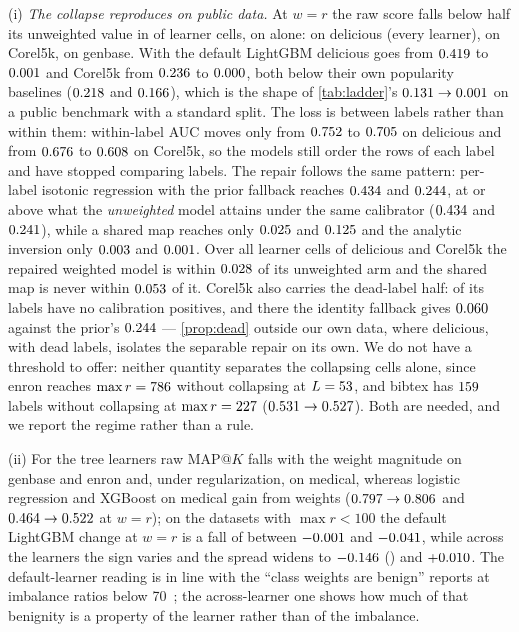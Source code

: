 \documentclass[sigconf,nonacm]{acmart}
\makeatletter
\newcommand{\mapk}{\mathrm{MAP}@K\xspace}
\makeatother
\begin{document}
(i) \emph{The collapse reproduces on public data.} At $w{=}r$ the raw score falls below half its unweighted value in \nnCollapseCells{} of \nnDoseCells{} learner cells, on \ncollapseDatasets{} alone: \nnDelCollapseLearners{} on delicious (every learner), \nnCorelCollapseLearners{} on Corel5k, \nnOtherCollapseCells{} on genbase. With the default LightGBM delicious goes from $0.419$ to $0.001$ and Corel5k from $0.236$ to $0.000$, both below their own popularity baselines ($0.218$ and $0.166$), which is the shape of \cref{tab:ladder}'s $0.131\to0.001$ on a public benchmark with a standard split. The loss is between labels rather than within them: within-label AUC moves only from $0.752$ to $0.705$ on delicious and from $0.676$ to $0.608$ on Corel5k, so the models still order the rows of each label and have stopped comparing labels. The repair follows the same pattern: per-label isotonic regression with the prior fallback reaches $0.434$ and $0.244$, at or above what the \emph{unweighted} model attains under the same calibrator ($0.434$ and $0.241$), while a shared map reaches only $0.025$ and $0.125$ and the analytic inversion only $0.003$ and $0.001$. Over all \nnRepairCollapseCells{} learner cells of delicious and Corel5k the repaired weighted model is within $0.028$ of its unweighted arm and the shared map is never within $0.053$ of it. Corel5k also carries the dead-label half: \ncorelDeadCalDose{} of its \ncorelL{} labels have no calibration positives, and there the identity fallback gives $0.060$ against the prior's $0.244$ --- \cref{prop:dead} outside our own data, where delicious, with \ndelDeadCalDose{} dead labels, isolates the separable repair on its own. We do not have a threshold to offer: neither quantity separates the collapsing cells alone, since enron reaches $\max r=786$ without collapsing at $L=53$, and bibtex has $159$ labels without collapsing at $\max r=227$ ($0.531\to0.527$). Both are needed, and we report the regime rather than a rule.

(ii) For the tree learners raw $\mapk$ falls with the weight magnitude on genbase and enron and, under regularization, on medical, whereas logistic regression and XGBoost on medical gain from weights ($0.797\to0.806$ and $0.464\to0.522$ at $w{=}r$); on the \nnMulanModest{} datasets with $\max r<100$ the default LightGBM change at $w{=}r$ is a fall of between $-0.001$ and $-0.041$, while across the \nnLearners{} learners the sign varies and the spread widens to $-0.146$ (\nmodestAnyWorstCell) and $+0.010$. The default-learner reading is in line with the ``class weights are benign'' reports at imbalance ratios below 70~\cite{Liu2026Resampling}; the across-learner one shows how much of that benignity is a property of the learner rather than of the imbalance.
\end{document}
